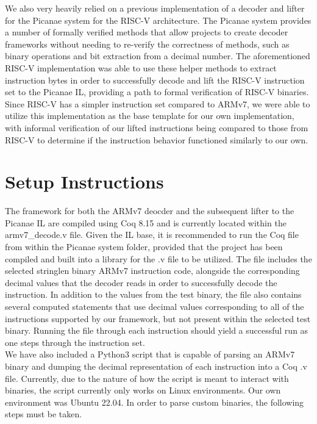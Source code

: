 \documentclass[twocolumn]{article}
\begin{document}
We also very heavily relied on a previous implementation of a decoder and lifter for the Picanae system for the RISC-V architecture. The Picanae system provides a number of formally verified methods that allow projects to create decoder frameworks without needing to re-verify the correctness of methods, such as binary operations and bit extraction from a decimal number. The aforementioned RISC-V implementation was able to use these helper methods to extract instruction bytes in order to successfully decode and lift the RISC-V instruction set to the Picanae IL, providing a path to formal verification of RISC-V binaries. Since RISC-V has a simpler instruction set compared to ARMv7, we were able to utilize this implementation as the base template for our own implementation, with informal verification of our lifted instructions being compared to those from RISC-V to determine if the instruction behavior functioned similarly to our own.

\section*{\centering Setup Instructions}
\vspace{0.3cm}

The framework for both the ARMv7 deocder and the subsequent lifter to the Picanae IL are compiled using Coq 8.15 and is currently located within the armv7\_decode.v file. Given the IL base, it is recommended to run the Coq file from within the Picanae system folder, provided that the project has been compiled and built into a library for the .v file to be utilized. The file includes the selected stringlen binary ARMv7 instruction code, alongside the corresponding decimal values that the decoder reads in order to successfully decode the instruction. In addition to the values from the test binary, the file also contains several computed statements that use decimal values corresponding to all of the instructions supported by our framework, but not present within the selected test binary. Running the file through each instruction should yield a successful run as one steps through the instruction set.\\

We have also included a Python3 script that is capable of parsing an ARMv7 binary and dumping the decimal representation of each instruction into a Coq .v file. Currently, due to the nature of how the script is meant to interact with binaries, the script currently only works on Linux environments. Our own environment was Ubuntu 22.04. In order to parse custom binaries, the following steps must be taken.
\end{document}
